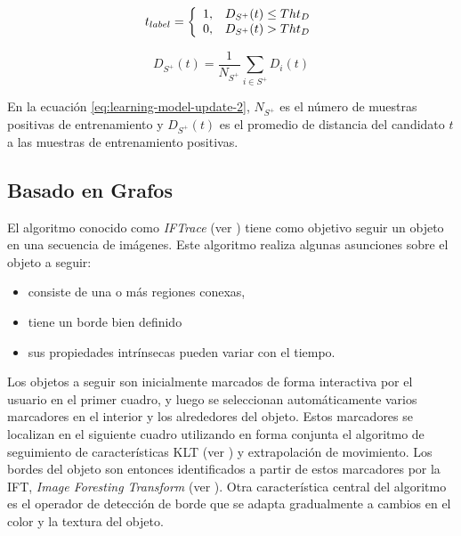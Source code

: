 \begin{equation}
    \label{eq:learning-model-update-1}
    t_{label} = \left\{
                \begin{array}{l l}
                    1, & D_{S^{+}}(t) \leq Tht_{D}\\
                    0, & D_{S^{+}}(t) >  Tht_{D}
                \end{array} \right.
\end{equation}

\begin{equation}
    \label{eq:learning-model-update-2}
    D_{S^{+}}(t) = \dfrac{1}{N_{S^{+}}} \sum_{i \in S^{+}} D_{i}(t)
\end{equation}

En la ecuación \ref{eq:learning-model-update-2}, $N_{S^{+}}$ es el
número de muestras positivas de entrenamiento y $D_{S^{+}}(t)$
es el promedio de distancia del candidato $t$ a las muestras
de entrenamiento positivas.

\subsection{Basado en Grafos}

El algoritmo conocido como \textit{IFTrace} (ver \cite{IFTrace}) tiene como objetivo
seguir un objeto en una secuencia de imágenes. Este algoritmo realiza algunas
asunciones sobre el objeto a seguir:

\begin{itemize}
    \item consiste de una o más regiones conexas,
    \item tiene un borde bien definido
    \item sus propiedades intrínsecas pueden variar con el tiempo.
\end{itemize}

Los objetos a seguir son inicialmente marcados de forma interactiva por el
usuario en el primer cuadro, y luego se seleccionan automáticamente varios
marcadores en el interior y los alrededores del objeto. Estos marcadores se
localizan en el siguiente cuadro utilizando en forma conjunta el algoritmo de
seguimiento de características KLT (ver \cite{KLT}) y extrapolación de
movimiento. Los bordes del objeto son entonces identificados a partir de estos
marcadores por la IFT, \textit{Image Foresting Transform} (ver \cite{IFT}).
Otra característica central del algoritmo es el operador de detección de borde
que se adapta gradualmente a cambios en el color y la textura del objeto.

